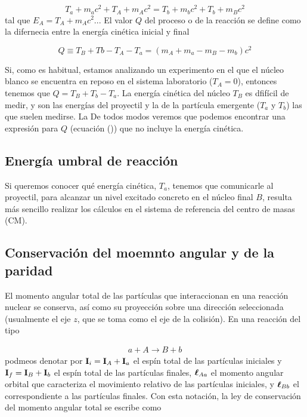 \begin{equation}
    T_a + m_a c^2 +T_A+m_A c^2 = T_b +m_bc^2 + T_b + m_Bc^2
\end{equation}
tal que $E_A = T_A + m_Ac^2$... El valor $Q$ del proceso o de la reacción se define como la difernecia entre la energía cinética inicial y final 

\begin{equation}
    Q \equiv T_B + Tb - T_A - T_a = (m_A + m_a - m_B - m_b) c^2
\end{equation}

Si, como es habitual, estamos analizando un experimento en el que el núcleo blanco se encuentra en reposo en el sistema laboratorio ($T_A=0$), entonces tenemos que $Q = T_B + T_b - T_a$. La energía cinética del núcleo $T_B$ es dfifícil de medir, y son las energías del proyectil y la de la partícula emergente ($T_a$ y $T_b$) las que suelen medirse. La De todos modos veremos que podemos encontrar una expresión para $Q$ (ecuación ())  que no incluye la energía cinética.



\subsection{Energía umbral de reacción}

Si queremos conocer qué energía cinética, $T_a$, tenemos que comunicarle al proyectil, para alcanzar un nivel excitado concreto en el núcleo final $B$, resulta más sencillo realizar los cálculos en el sistema de referencia del centro de masas (CM).  

\subsection{Conservación del moemnto angular y de la paridad}

El momento angular total de las partículas que interaccionan en una reacción nuclear se conserva, así como su proyección sobre una dirección seleccionada (usualmente el eje $z$, que se toma como el eje de la colisión). En una reacción del tipo 

\begin{eqnarray}
    a + A \longrightarrow B + b
\end{eqnarray}
podmeos denotar por $\mathbf{I}_i = \mathbf{I}_A + \mathbf{I}_a$ el espín total de las partículas iniciales y $\mathbf{I}_f=\mathbf{I}_B + \mathbf{I}_b$ el espín total de las partículas finales, $\boldsymbol{\ell}_{Aa}$ el momento angular orbital que caracteriza el movimiento relativo de las partículas iniciales, y $\boldsymbol{\ell}_{Bb}$ el correspondiente a las partículas finales. Con esta notación, la ley de conservación del momento angular total se escribe como 

